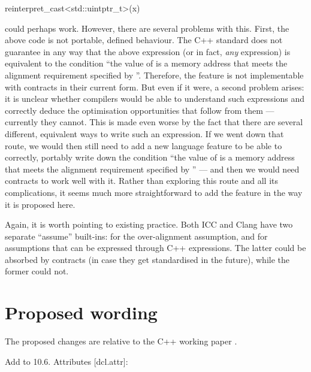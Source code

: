 \begin{codeblock}
reinterpret_cast<std::uintptr_t>(x) %
\end{codeblock}

could perhaps work. However, there are several problems with this. First, the above code is not portable, defined behaviour. The C++ standard does not guarantee in any way that the above expression (or in fact, \emph{any} expression) is equivalent to the condition ``the value of  is a memory address that meets the alignment requirement specified by ''. Therefore, the feature is not implementable with contracts in their current form. But even if it were, a second problem arises: it is unclear whether compilers would be able to understand such expressions and correctly deduce the optimisation opportunities that follow from them --- currently they cannot. This is made even worse by the fact that there are several different, equivalent ways to write such an expression. If we went down that route, we would then still need to add a new language feature to be able to correctly, portably write down the condition ``the value of  is a memory address that meets the alignment requirement specified by '' --- and then we would need contracts to work well with it. Rather than exploring this route and all its complications, it seems much more straightforward to add the feature in the way it is proposed here.

Again, it is worth pointing to existing practice. Both ICC and Clang have two separate ``assume'' built-ins:  for the over-alignment assumption, and  for assumptions that can be expressed through C++ expressions. The latter could be absorbed by contracts (in case they get standardised in the future), while the former could not.

\section{Proposed wording}

The proposed changes are relative to the C++ working paper \cite{Smith2017}.

Add to 10.6. Attributes [dcl.attr]:

